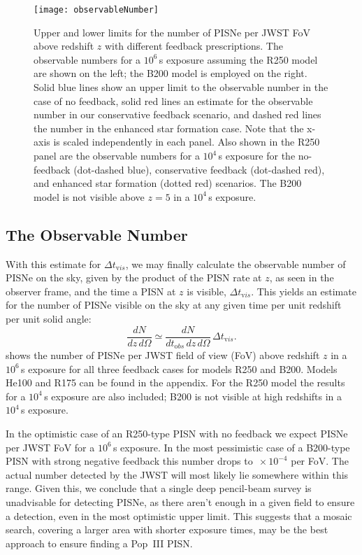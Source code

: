 \documentclass[../thesis.tex]{subfiles}
\begin{document}
\begin{figure}
 \begin{center}
   \texttt{[image: observableNumber]}
   \caption{Upper and lower limits for the number of
     PISNe per JWST FoV above redshift $z$ with different feedback
     prescriptions. The observable numbers for a $10^6\,$s exposure
     assuming the R250 model are shown on the left; the B200 model is
     employed on the right. Solid blue lines show an upper limit to
     the observable number in the case of no feedback, solid red lines
     an estimate for the observable number in our conservative
     feedback scenario, and dashed red lines the number in the
     enhanced star formation case. Note that the x-axis is scaled
     independently in each panel.  Also shown in the R250 panel are
     the observable numbers for a $10^4\,$s exposure for the
     no-feedback (dot-dashed blue), conservative feedback (dot-dashed
     red), and enhanced star formation (dotted red) scenarios. The
     B200 model is not visible above $z=5$ in a $10^4\,$s exposure.}
   \label{obsnumber}
 \end{center}
\end{figure} 
\subsection{The Observable Number}
 With this estimate for $\Delta t_{\mathrm vis}$, we may finally calculate
 the observable number of PISNe on the sky, given by the product of
 the PISN rate at $z$, as seen in the observer frame, and the time a
 PISN at $z$ is visible, $\Delta t_{\mathrm vis}$. This yields an estimate
 for the number of PISNe visible on the sky at any given time per unit
 redshift per unit solid angle:
\begin{equation} 
\frac{dN}{dz\,d\Omega} \simeq \frac{dN}{dt_{\mathrm
    obs}\,dz\,d\Omega}\,\Delta t_{\mathrm vis}.
\end{equation}
 shows the number of PISNe per JWST field of view
(FoV) above redshift $z$ in a $10^6\,$s exposure for all three
feedback cases for models R250 and B200. Models He100 and R175 can be
found in the appendix.  For the R250 model the results for a $10^4\,$s
exposure are also included; B200 is not visible at high redshifts in a
$10^4\,$s exposure.

In the optimistic case of an R250-type PISN with no feedback we expect
 PISNe per JWST FoV for a $10^6\,$s exposure.  In the most
pessimistic case of a B200-type PISN with strong negative feedback
this number drops to $\,\times10^{-4}$ per FoV.  The actual
number detected by the JWST will most likely lie somewhere within this
range. Given this, we conclude that a single deep pencil-beam survey
is unadvisable for detecting PISNe, as there aren't enough in a given
field to ensure a detection, even in the most optimistic upper limit.
This suggests that a mosaic search, covering a larger area with shorter
exposure times, may be the best approach to ensure finding a Pop~III
PISN.
\end{document}
